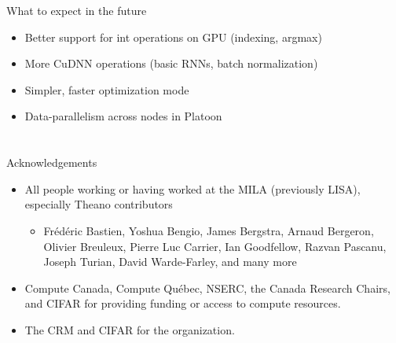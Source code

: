 \documentclass[a4paper,9pt]{beamer}
\begin{document}
\begin{frame}[fragile]{What to expect in the future}
  \begin{itemize}
    \item Better support for int operations on GPU (indexing, argmax)
    \item More CuDNN operations (basic RNNs, batch normalization)
    \item Simpler, faster optimization mode
    \item Data-parallelism across nodes in Platoon
  \end{itemize}
\end{frame}


\section{}

\begin{frame}{Acknowledgements}
  \begin{itemize}
    \item All people working or having worked at the MILA (previously LISA), especially Theano contributors
      \begin{itemize}
        \item
          Frédéric Bastien,
          Yoshua Bengio,
          James Bergstra,
          Arnaud Bergeron,
          Olivier Breuleux,
          Pierre Luc Carrier,
          Ian Goodfellow,
          Razvan Pascanu,
          Joseph Turian,
          David Warde-Farley,
          and many more
      \end{itemize}
    \item Compute Canada, Compute Québec, NSERC, the Canada Research Chairs, and CIFAR for providing funding or access to compute resources.
    \item The CRM and CIFAR for the organization.
  \end{itemize}
\end{frame}
\end{document}
